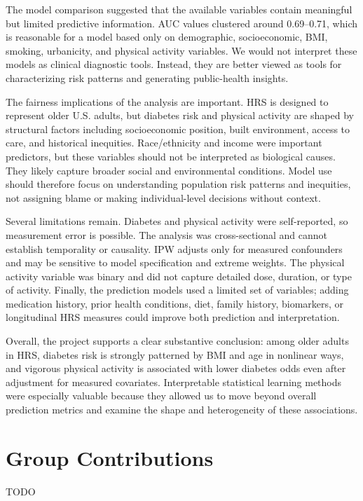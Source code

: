 \documentclass[10pt]{article}
\begin{document}
The model comparison suggested that the available variables contain meaningful but limited predictive information. AUC values clustered around 0.69--0.71, which is reasonable for a model based only on demographic, socioeconomic, BMI, smoking, urbanicity, and physical activity variables. We would not interpret these models as clinical diagnostic tools. Instead, they are better viewed as tools for characterizing risk patterns and generating public-health insights.

The fairness implications of the analysis are important. HRS is designed to represent older U.S. adults, but diabetes risk and physical activity are shaped by structural factors including socioeconomic position, built environment, access to care, and historical inequities. Race/ethnicity and income were important predictors, but these variables should not be interpreted as biological causes. They likely capture broader social and environmental conditions. Model use should therefore focus on understanding population risk patterns and inequities, not assigning blame or making individual-level decisions without context.

Several limitations remain. Diabetes and physical activity were self-reported, so measurement error is possible. The analysis was cross-sectional and cannot establish temporality or causality. IPW adjusts only for measured confounders and may be sensitive to model specification and extreme weights. The physical activity variable was binary and did not capture detailed dose, duration, or type of activity. Finally, the prediction models used a limited set of variables; adding medication history, prior health conditions, diet, family history, biomarkers, or longitudinal HRS measures could improve both prediction and interpretation.

Overall, the project supports a clear substantive conclusion: among older adults in HRS, diabetes risk is strongly patterned by BMI and age in nonlinear ways, and vigorous physical activity is associated with lower diabetes odds even after adjustment for measured covariates. Interpretable statistical learning methods were especially valuable because they allowed us to move beyond overall prediction metrics and examine the shape and heterogeneity of these associations.

\section*{Group Contributions}

TODO
\end{document}

